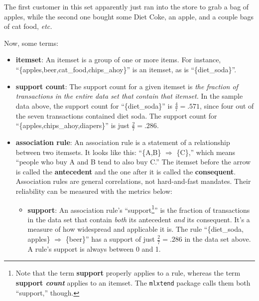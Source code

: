The first customer in this set apparently just ran into the store to grab a bag
of apples, while the second one bought some Diet Coke, an apple, and a couple
bags of cat food, \textit{etc.}

\bigskip
Now, some terms:
\vspace{-.15in}

\begin{itemize}
\itemsep.1em


\item \textbf{itemset}: An itemset is a group of one or more items. For
instance, ``\{apples,beer,cat\_food,chips\_ahoy\}'' is an itemset, as is
``\{diet\_soda\}''.


\item \textbf{support count}: The support count for a given itemset is
\textit{the fraction of transactions in the entire data set that contain that
itemset.} In the sample data above, the support count for ``\{diet\_soda\}'' is
$\frac{4}{7} = .571$, since four out of the seven transactions contained diet
soda. The support count for ``\{apples,chips\_ahoy,diapers\}'' is just
$\frac{2}{7} = .286$.


\item \textbf{association rule}: An association rule is a statement of a
relationship between two itemsets. It looks like this: ``\{A,B\} $\Rightarrow$
\{C\},'' which means ``people who buy A and B tend to also buy C.'' The itemset
before the arrow is called the \textbf{antecedent} and the one after it is
called the \textbf{consequent}. Association
rules are general correlations, not hard-and-fast mandates. Their reliability
can be measured with the metrics below:

\vspace{-.15in}

\begin{itemize}


    \item \textbf{support}: An association rule's ``support\footnote{Note that
    the term \textbf{support} properly applies to a rule, whereas the term
    \textbf{support \textit{count}} applies to an itemset. The \texttt{mlxtend}
    package calls them both ``support,'' though.}'' is the fraction
    of transactions in the data set that contain \textit{both} its antecedent
    \textit{and} its consequent. It's a measure of how widespread and
    applicable it is. The rule ``\{diet\_soda, apples\} $\Rightarrow$
    \{beer\}'' has a support of just $\frac{2}{7} = .286$ in the data set
    above. A rule's support is always between 0 and 1.


\end{itemize}
\end{itemize}
